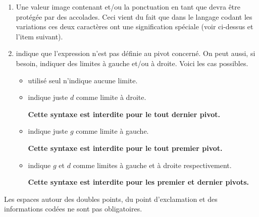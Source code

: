 \documentclass[10pt, a4paper]{article}
\begin{document}
\begin{enumerate}
\begin{itemize}
\begin{enumerate}
            \item Une valeur image contenant  et/ou la ponctuation \tdoclatexin{!} en tant que  devra être protégée par des accolades. Ceci vient du fait que dans le langage codant les variations ces deux caractères ont une signification spéciale (voir ci-dessus et l'item suivant).

            \item \tdoclatexin{!} indique que
l'expression n'est pas définie au pivot concerné.
            On peut aussi, si besoin, indiquer des limites à gauche et/ou à droite. Voici les cas possibles.
            \begin{itemize}
                \item \tdoclatexin{!} utilisé seul n'indique aucune limite.


                \item  {} indique juste $d$ comme limite à droite.

                \textbf{Cette syntaxe est interdite pour le tout dernier pivot.}


                \item {} indique juste $g$ comme limite à gauche.

                \textbf{Cette syntaxe est interdite pour le tout premier pivot.}


                \item  {} indique $g$ et $d$ comme limites à gauche et à droite respectivement.

                \textbf{Cette syntaxe est interdite pour les premier et dernier pivots.}
            \end{itemize}
        \end{enumerate}
    \end{itemize}
\end{enumerate}








\begin{tdocnote}
    Les espaces autour des doubles points, du point d'exclamation et des informations codées ne sont pas obligatoires.
\end{tdocnote}
\end{document}
